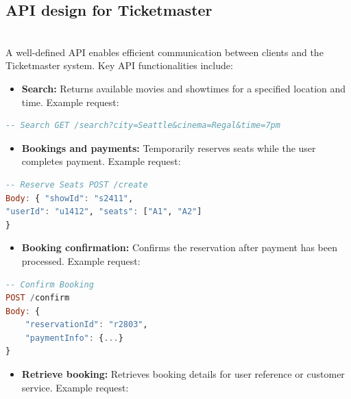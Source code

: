 \subsection{API design for Ticketmaster}\label{V_H1vfBQmyOwhRvWsE0Gz}
\\
A well-defined API enables efficient communication between clients and the Ticketmaster system. Key API functionalities include:

\begin{itemize}
\item
\protect{}\label{H0AZCGVcK-c2mK_IjRLX9}
\textbf{Search:} Returns available movies and showtimes for a specified location and time. Example request:
\end{itemize}

\begin{lstlisting}[language=haskell]
-- Search GET /search?city=Seattle&cinema=Regal&time=7pm
\end{lstlisting}

\begin{itemize}
\item
\protect{}\label{fWm5RwhQ3ynE2F3bjLXWd}
\textbf{Bookings and payments:} Temporarily reserves seats while the user completes payment. Example request:
\end{itemize}

\begin{lstlisting}[language=haskell]
-- Reserve Seats POST /create
Body: { "showId": "s2411",
"userId": "u1412", "seats": ["A1", "A2"]
}
\end{lstlisting}

\begin{itemize}
\item
\protect{}\label{S8rxqF_IqTelpR_vo7okI}
\textbf{Booking confirmation:} Confirms the reservation after payment has been processed. Example request:
\end{itemize}

\begin{lstlisting}[language=haskell]
-- Confirm Booking
POST /confirm
Body: {
    "reservationId": "r2803",
    "paymentInfo": {...}
}
\end{lstlisting}

\begin{itemize}
\item
\protect{}\label{8o5PYDMLFUgX11xjhFSSj}
\textbf{Retrieve booking:} Retrieves booking details for user reference or customer service. Example request:
\end{itemize}

